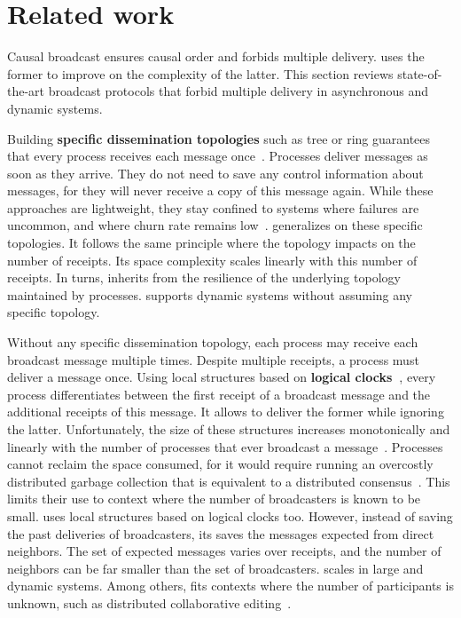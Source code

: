 
\section{Related work}
\label{sec:relatedwork}

Causal broadcast ensures causal order and forbids multiple
delivery. \RPCBROADCAST uses the former to improve on the complexity of the
latter.  This section reviews state-of-the-art broadcast protocols that forbid
multiple delivery in asynchronous and dynamic systems.

Building \textbf{specific dissemination topologies} such as tree or ring
guarantees that every process receives each message
once~\cite{bravo2017saturn,raynal2013distributed}. Processes deliver messages as
soon as they arrive. They do not need to save any control information about
messages, for they will never receive a copy of this message again. While these
approaches are lightweight, they stay confined to systems where failures are
uncommon, and where churn rate remains
low~\cite{krasikova2016hashtable}. \RPCBROADCAST generalizes on these specific
topologies. It follows the same principle where the topology impacts on the
number of receipts. Its space complexity scales linearly with this number of
receipts. In turns, \RPCBROADCAST inherits from the resilience of the underlying
topology maintained by processes. \RPCBROADCAST supports dynamic systems without
assuming any specific topology.


Without any specific dissemination topology, each process may receive each
broadcast message multiple times. Despite multiple receipts, a process must
deliver a message once.  Using local structures based on \textbf{logical
  clocks~\cite{lamport1978time}}, every process differentiates between the first
receipt of a broadcast message and the additional receipts of this message. It
allows to deliver the former while ignoring the latter. Unfortunately, the size
of these structures increases monotonically and linearly with the number of
processes that ever broadcast a
message~\cite{malkhi2007concise,mukund2014optimized}.  Processes cannot reclaim
the space consumed, for it would require running an overcostly distributed
garbage collection that is equivalent to a distributed
consensus~\cite{abdullahi1998garbage}.  This limits their use to context where
the number of broadcasters is known to be small.  \RPCBROADCAST uses local
structures based on logical clocks too. However, instead of saving the past
deliveries of broadcasters, its saves the messages expected from direct
neighbors. The set of expected messages varies over receipts, and the number of
neighbors can be far smaller than the set of broadcasters. \RPCBROADCAST scales
in large and dynamic systems. Among others, \RPCBROADCAST fits contexts where
the number of participants is unknown, such as distributed collaborative
editing~\cite{nedelec2016crate}.

